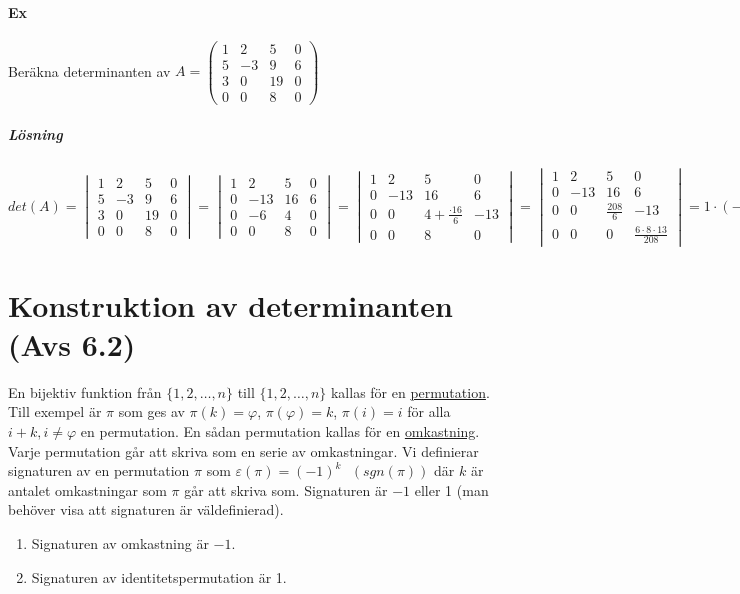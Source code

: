 \paragraph{Ex} Beräkna determinanten av $A=\begin{pmatrix}
    1&2&5&0\\
    5&-3&9&6\\
    3&0&19&0\\
    0&0&8&0
\end{pmatrix}$
\subparagraph{Lösning} $det(A)=\begin{vmatrix}
    1&2&5&0\\
    5&-3&9&6\\
    3&0&19&0\\
    0&0&8&0
\end{vmatrix}=
\begin{vmatrix}
    1&2&5&0\\
    0&-13&16&6\\
    0&-6&4&0\\
    0&0&8&0
\end{vmatrix}=
\begin{vmatrix}
    1&2&5&0\\
    0&-13&16&6\\
    0&0&4+\frac{\cdot 16}{6}&-13\\
    0&0&8&0
\end{vmatrix}=
\begin{vmatrix}
    1&2&5&0\\
    0&-13&16&6\\
    0&0&\frac{208}{6}&-13\\
    0&0&0&\frac{6\cdot 8\cdot 13}{208}
\end{vmatrix}=1\cdot (-13)\cdot \frac{208}{6}\cdot \frac{6\cdot 8 \cdot 13}{208}=-8\cdot 13^{2}$

\section{Konstruktion av determinanten (Avs 6.2)}
En bijektiv funktion från $\{1,2,\ldots,n\}$ till $\{1,2,\ldots,n\}$ kallas för en \underline{permutation}.
Till exempel är $\pi$  som ges av $\pi (k)=\varphi$, $\pi (\varphi)=k$, $\pi (i)=i$ för alla $i+k,i\neq\varphi$ en permutation.
En sådan permutation kallas för en \underline{omkastning}.
Varje permutation går att skriva som en serie av omkastningar.
Vi definierar signaturen av en permutation $\pi$ som $\varepsilon (\pi)=(-1)^{k} \text{ }(sgn(\pi))$ där $k$ är antalet omkastningar som $\pi$ går att skriva som.
Signaturen är $-1$ eller 1 (man behöver visa att signaturen är väldefinierad).
\begin{enumerate}
    \item[] Signaturen av omkastning är $-1$.
    \item[] Signaturen av identitetspermutation är 1.
\end{enumerate}

